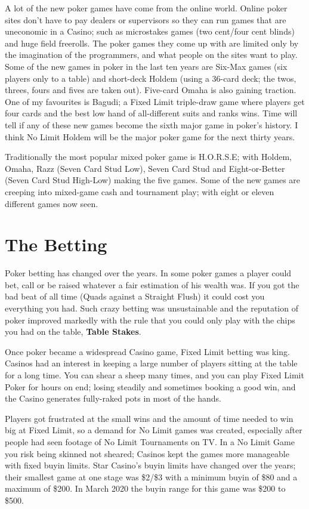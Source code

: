 A lot of the new poker games have come from the online world. Online
poker sites don't have to pay dealers or supervisors so they can run
games that are uneconomic in a Casino; such as microstakes games (two
cent/four cent blinds) and huge field freerolls. The poker games they
come up with are limited only by the imagination of the programmers,
and what people on the sites want to play. Some of the new games
in poker in the last ten years are Six-Max games (six players only to
a table) and short-deck Holdem (using a 36-card deck; the twos,
threes, fours and fives are taken out). Five-card Omaha is also
gaining traction. One of my favourites is Bagudi; a Fixed Limit
triple-draw game where players get four cards and the best low hand of
all-different suits and ranks wins. Time will tell if any of these new
games become the sixth major game in poker's history. I think No Limit
Holdem will be the major poker game for the next thirty years.

Traditionally the most popular mixed poker game is H.O.R.S.E; with
Holdem, Omaha, Razz (Seven Card Stud Low), Seven Card Stud and
Eight-or-Better (Seven Card Stud High-Low) making the five games.
Some of the new games are creeping into mixed-game cash and tournament
play; with eight or eleven different games now seen.

\section{The Betting}

Poker betting has changed over the years. In some poker games
a player could bet, call or be raised whatever a fair estimation of
his wealth was. If you got the bad beat of all time (Quads against
a Straight Flush) it could cost you everything you had. Such crazy
betting was unsustainable and the reputation of poker
improved markedly with the rule that you could only play with the
chips you had on the table, \textbf{Table Stakes}.

Once poker became a widespread Casino game, Fixed Limit betting was
king. Casinos had an interest in keeping a large number of players
sitting at the table for a long time. You can shear a sheep many times,
and you can play Fixed Limit Poker for hours on end; losing steadily
and sometimes booking a good win, and the Casino generates fully-raked
pots in most of the hands.


Players got frustrated at the small wins and the amount of time needed
to win big at Fixed Limit, so a demand for No Limit games was created,
especially after people had seen footage of No Limit Tournaments on TV.
In a No Limit Game you risk being skinned not sheared; Casinos kept
the games more manageable with fixed buyin limits. Star Casino's buyin limits
have changed over the years; their smallest game at one stage was
\$2/\$3 with a minimum buyin of \$80 and a maximum of \$200. In March 2020
the buyin range for this game was \$200 to \$500.


